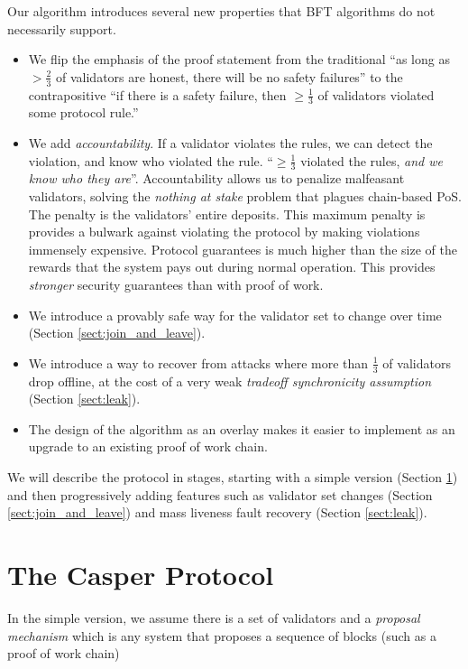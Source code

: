 \documentclass[12pt]{article}
\begin{document}
Our algorithm introduces several new properties that BFT algorithms do not necessarily support.
\begin{itemize}
\item We flip the emphasis of the proof statement from the traditional ``as long as $>\frac{2}{3}$ of validators are honest, there will be no safety failures'' to the contrapositive ``if there is a safety failure, then $\ge \frac{1}{3}$ of validators violated some protocol rule.''

\item We add \textit{accountability}.  If a validator violates the rules, we can detect the violation, and know who violated the rule.  ``$\ge \frac{1}{3}$ violated the rules, \textit{and we know who they are}''.  Accountability allows us to penalize malfeasant validators, solving the \textit{nothing at stake} problem  that plagues chain-based PoS. The penalty is the validators' entire deposits.  This maximum penalty is provides a bulwark against violating the protocol by making violations immensely expensive.  Protocol guarantees is much higher than the size of the rewards that the system pays out during normal operation.  This provides \textit{stronger} security guarantees than with proof of work.

\item We introduce a provably safe way for the validator set to change over time (Section \ref{sect:join_and_leave}).
\item We introduce a way to recover from attacks where more than $\frac{1}{3}$ of validators drop offline, at the cost of a very weak \textit{tradeoff synchronicity assumption} (Section \ref{sect:leak}).
\item The design of the algorithm as an overlay makes it easier to implement as an upgrade to an existing proof of work chain.
\end{itemize}

We will describe the protocol in stages, starting with a simple version (Section \ref{sect:protocol}) and then progressively adding features such as validator set changes (Section \ref{sect:join_and_leave}) and mass liveness fault recovery (Section \ref{sect:leak}). 


\section{The Casper Protocol}
\label{sect:protocol}
In the simple version, we assume there is a set of validators and a \textit{proposal mechanism} which is any system that proposes a sequence of blocks (such as a proof of work chain)
\end{document}
